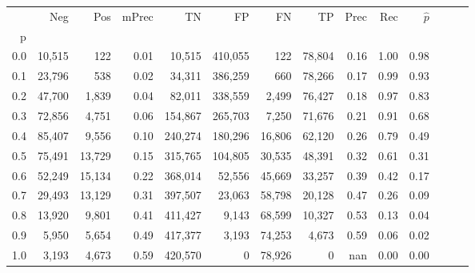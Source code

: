 \begin{tabular}{rrrrrrrrrrrrrr}
\toprule
{} &     Neg &     Pos & mPrec &       TN &       FP &      FN &      TP &  Prec &   Rec & $\hat{p}$ \\
p   &         &         &       &          &          &         &         &       &       &           \\
\midrule
0.0 &  10,515 &     122 &  0.01 &   10,515 &  410,055 &     122 &  78,804 &  0.16 &  1.00 &      0.98 \\
0.1 &  23,796 &     538 &  0.02 &   34,311 &  386,259 &     660 &  78,266 &  0.17 &  0.99 &      0.93 \\
0.2 &  47,700 &   1,839 &  0.04 &   82,011 &  338,559 &   2,499 &  76,427 &  0.18 &  0.97 &      0.83 \\
0.3 &  72,856 &   4,751 &  0.06 &  154,867 &  265,703 &   7,250 &  71,676 &  0.21 &  0.91 &      0.68 \\
0.4 &  85,407 &   9,556 &  0.10 &  240,274 &  180,296 &  16,806 &  62,120 &  0.26 &  0.79 &      0.49 \\
0.5 &  75,491 &  13,729 &  0.15 &  315,765 &  104,805 &  30,535 &  48,391 &  0.32 &  0.61 &      0.31 \\
0.6 &  52,249 &  15,134 &  0.22 &  368,014 &   52,556 &  45,669 &  33,257 &  0.39 &  0.42 &      0.17 \\
0.7 &  29,493 &  13,129 &  0.31 &  397,507 &   23,063 &  58,798 &  20,128 &  0.47 &  0.26 &      0.09 \\
0.8 &  13,920 &   9,801 &  0.41 &  411,427 &    9,143 &  68,599 &  10,327 &  0.53 &  0.13 &      0.04 \\
0.9 &   5,950 &   5,654 &  0.49 &  417,377 &    3,193 &  74,253 &   4,673 &  0.59 &  0.06 &      0.02 \\
1.0 &   3,193 &   4,673 &  0.59 &  420,570 &        0 &  78,926 &       0 &   nan &  0.00 &      0.00 \\
\bottomrule
\end{tabular}
